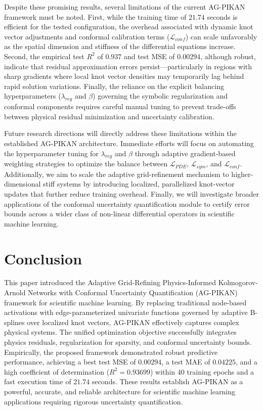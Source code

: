 \documentclass[10pt,twocolumn]{article}
\begin{document}
Despite these promising results, several limitations of the current AG-PIKAN framework must be noted. First, while the training time of $21.74$ seconds is efficient for the tested configuration, the overhead associated with dynamic knot vector adjustments and conformal calibration terms ($\mathcal{L}_{conf}$) can scale unfavorably as the spatial dimension and stiffness of the differential equations increase. Second, the empirical test $R^2$ of $0.937$ and test MSE of $0.00294$, although robust, indicate that residual approximation errors persist—particularly in regions with sharp gradients where local knot vector densities may temporarily lag behind rapid solution variations. Finally, the reliance on the explicit balancing hyperparameters ($\lambda_{reg}$ and $\beta$) governing the symbolic regularization and conformal components requires careful manual tuning to prevent trade-offs between physical residual minimization and uncertainty calibration.


Future research directions will directly address these limitations within the established AG-PIKAN architecture. Immediate efforts will focus on automating the hyperparameter tuning for $\lambda_{reg}$ and $\beta$ through adaptive gradient-based weighting strategies to optimize the balance between $\mathcal{L}_{PDE}$, $\mathcal{L}_{sym}$, and $\mathcal{L}_{conf}$. Additionally, we aim to scale the adaptive grid-refinement mechanism to higher-dimensional stiff systems by introducing localized, parallelized knot-vector updates that further reduce training overhead. Finally, we will investigate broader applications of the conformal uncertainty quantification module to certify error bounds across a wider class of non-linear differential operators in scientific machine learning.

\section{Conclusion}
This paper introduced the Adaptive Grid-Refining Physics-Informed Kolmogorov-Arnold Networks with Conformal Uncertainty Quantification (AG-PIKAN) framework for scientific machine learning. By replacing traditional node-based activations with edge-parameterized univariate functions governed by adaptive B-splines over localized knot vectors, AG-PIKAN effectively captures complex physical systems. The unified optimization objective successfully integrates physics residuals, regularization for sparsity, and conformal uncertainty bounds. Empirically, the proposed framework demonstrated robust predictive performance, achieving a best test MSE of $0.00294$, a test MAE of $0.04225$, and a high coefficient of determination ($R^2 = 0.93699$) within 40 training epochs and a fast execution time of $21.74$ seconds. These results establish AG-PIKAN as a powerful, accurate, and reliable architecture for scientific machine learning applications requiring rigorous uncertainty quantification.



\end{document}
